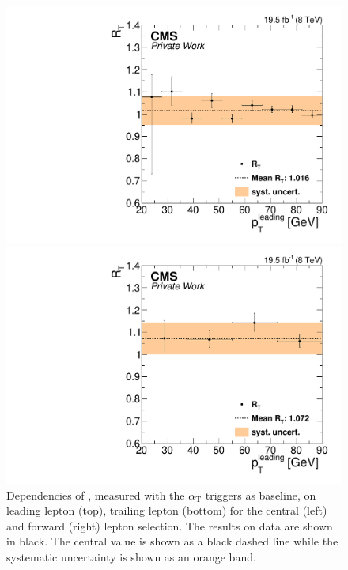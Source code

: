 \begin{figure}[htbp]
\begin{minipage}[t]{0.49\textwidth}
\end{minipage}
\begin{minipage}[t]{0.49\textwidth}
  \includegraphics[width=\textwidth]{plots/BG/trigger/Triggereff_SFvsOF_Syst_AlphaT_HighHTExclusiveCentral_Full2012_LeadingPt_trailingPt20.pdf}
\end{minipage}
\begin{minipage}[t]{0.49\textwidth}
\includegraphics[width=\textwidth]{plots/BG/trigger/Triggereff_SFvsOF_Syst_AlphaT_HighHTExclusiveForward_Full2012_LeadingPt_trailingPt20.pdf}
\end{minipage}

\caption{Dependencies of \RT, measured with the $\alpha_{\mathrm{T}}$ triggers as baseline, on leading lepton \pt (top), trailing lepton \pt (bottom) for the central (left) and forward (right) lepton selection. The results on data are shown in black. The central value is shown as a black dashed line while the systematic uncertainty is shown as an orange band.}
\label{fig:RTDependenciesApp1}
\end{figure}  

